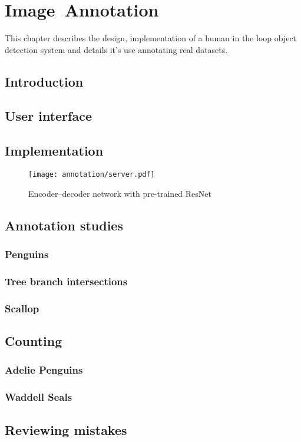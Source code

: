 \chapter{Image~Annotation}
\label{chap:annotation} 

This chapter describes the design, implementation of a human in the loop object detection system and details it's use annotating real datasets.

\section{Introduction}

\section {User interface}


\section {Implementation}

\begin{figure}[h]
  \centering
  \texttt{[image: annotation/server.pdf]}
  \caption{Encoder--decoder network with pre-trained ResNet}  
  \label{fig:bootstrap_network}
\end{figure}

\section{Annotation studies}

\subsection {Penguins}
\subsection{Tree branch intersections}
\subsection{Scallop}


\section{Counting}

\subsection{Adelie Penguins}
\subsection{Waddell Seals}




\section {Reviewing mistakes}